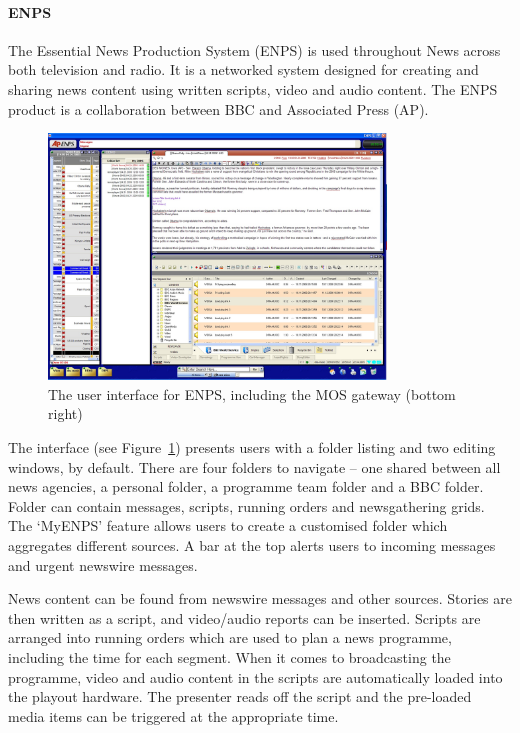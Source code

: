 \paragraph{ENPS}
The Essential News Production System (ENPS) is used throughout News across both
television and radio. It is a networked system designed for creating and
sharing news content using written scripts, video and audio content. The ENPS
product is a collaboration between BBC and Associated Press (AP).

\begin{figure}[p]
\centering
\includegraphics[width=0.8\textwidth]{figs/enps.jpg}
\caption{The user interface for ENPS, including the MOS gateway (bottom right)}
\label{fig:enps}
\end{figure}

The interface (see Figure~\ref{fig:enps}) presents users with a folder
listing and two editing windows, by default. There are four folders to navigate
-- one shared between all news agencies, a personal folder, a programme team
folder and a BBC folder. Folder can contain messages, scripts, running orders
and newsgathering grids. The `MyENPS' feature allows users to create a
customised folder which aggregates different sources. A bar at the top alerts
users to incoming messages and urgent newswire messages.

News content can be found from newswire messages and other sources. Stories are
then written as a script, and video/audio reports can be inserted. Scripts are
arranged into running orders which are used to plan a news programme, including
the time for each segment. When it comes to broadcasting the programme, video
and audio content in the scripts are automatically loaded into the playout
hardware. The presenter reads off the script and the pre-loaded media items can
be triggered at the appropriate time.

